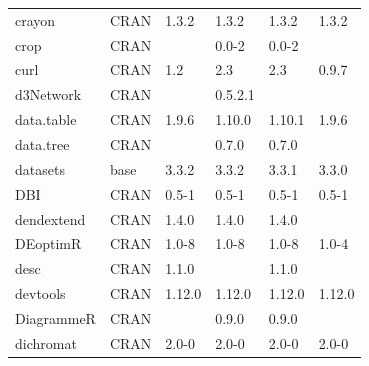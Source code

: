 \begin{longtable}{llllll}
\rowcolor{black!5}
crayon                        & CRAN                      & 1.3.2       & 1.3.2       & 1.3.2          & 1.3.2              \\
\rowcolor{black!10}
crop                          & CRAN                      &             & 0.0-2       & 0.0-2          &                   \\
\rowcolor{black!5}
curl                          & CRAN                      & 1.2         & 2.3         & 2.3            & 0.9.7              \\
\rowcolor{black!10}
d3Network                     & CRAN                      &             & 0.5.2.1     &                &                   \\
\rowcolor{black!5}
data.table                    & CRAN                      & 1.9.6       & 1.10.0      & 1.10.1         & 1.9.6              \\
\rowcolor{black!10}
data.tree                     & CRAN                      &             & 0.7.0       & 0.7.0          &                   \\
\rowcolor{black!5}
datasets                      & base                      & 3.3.2       & 3.3.2       & 3.3.1          & 3.3.0              \\
\rowcolor{black!10}
DBI                           & CRAN                      & 0.5-1       & 0.5-1       & 0.5-1          & 0.5-1             \\
\rowcolor{black!5}
dendextend                    & CRAN                      & 1.4.0       & 1.4.0       & 1.4.0          &                    \\
\rowcolor{black!10}
DEoptimR                      & CRAN                      & 1.0-8       & 1.0-8       & 1.0-8          & 1.0-4             \\
\rowcolor{black!5}
desc                          & CRAN                      & 1.1.0       &             & 1.1.0          &                    \\
\rowcolor{black!10}
devtools                      & CRAN                      & 1.12.0      & 1.12.0      & 1.12.0         & 1.12.0            \\
\rowcolor{black!5}
DiagrammeR                    & CRAN                      &             & 0.9.0       & 0.9.0          &                    \\
\rowcolor{black!10}
dichromat                     & CRAN                      & 2.0-0       & 2.0-0       & 2.0-0          & 2.0-0             \\

\end{longtable}
